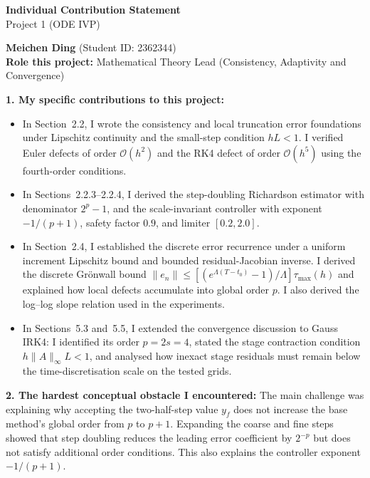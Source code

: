 \documentclass[10pt,a4paper]{article}
\begin{document}
\begin{center}
{\Large\bfseries Individual Contribution Statement}\\[0.15em]
{\large Project 1 (ODE IVP)}
\end{center}
\begin{formbox}
\footnotesize
\textbf{Meichen Ding} (Student ID: 2362344)\\
\textbf{Role this project:} Mathematical Theory Lead (Consistency,
Adaptivity and Convergence)

\textbf{1. My specific contributions to this project:}
\begin{itemize}[leftmargin=1.3em,itemsep=1pt,topsep=1pt]
    \item In Section~2.2, I wrote the consistency and local truncation error
    foundations under Lipschitz continuity and the small-step condition
    $hL<1$. I verified Euler defects of order $\mathcal{O}(h^2)$ and the RK4
    defect of order $\mathcal{O}(h^5)$ using the fourth-order conditions.
    \item In Sections~2.2.3--2.2.4, I derived the step-doubling Richardson
    estimator with denominator $2^p-1$, and the scale-invariant controller
    with exponent $-1/(p+1)$, safety factor $0.9$, and limiter $[0.2,2.0]$.
    \item In Section~2.4, I established the discrete error recurrence under a
    uniform increment Lipschitz bound and bounded residual-Jacobian inverse. I
    derived the discrete Gr\"onwall bound
    $\|e_n\|\leq[(e^{\Lambda(T-t_0)}-1)/\Lambda]\tau_{\max}(h)$ and explained
    how local defects accumulate into global order $p$. I also derived the
    log--log slope relation used in the experiments.
    \item In Sections~5.3 and~5.5, I extended the convergence discussion to
    Gauss IRK4: I identified its order $p=2s=4$, stated the stage contraction
    condition $h\|A\|_\infty L<1$, and analysed how inexact stage residuals
    must remain below the time-discretisation scale on the tested grids.
\end{itemize}

\textbf{2. The hardest conceptual obstacle I encountered:}
The main challenge was explaining why accepting the two-half-step value $y_f$
does not increase the base method's global order from $p$ to $p+1$. Expanding
the coarse and fine steps showed that step doubling reduces the leading error
coefficient by $2^{-p}$ but does not satisfy additional order conditions. This
also explains the controller exponent $-1/(p+1)$.


\end{formbox}
\end{document}
